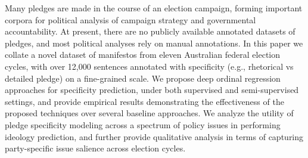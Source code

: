 Many pledges are made in the course of an election campaign, forming important corpora for political analysis of campaign strategy and governmental accountability.  At present, there are no publicly available annotated datasets of pledges, and most political analyses rely on manual annotations. In this paper we collate a novel dataset of manifestos from eleven Australian federal election cycles, with over 12,000 sentences annotated with specificity (e.g., rhetorical vs detailed pledge) on a fine-grained scale. We propose deep ordinal regression approaches for specificity prediction, under both supervised and semi-supervised settings, and provide empirical results demonstrating the effectiveness of the proposed techniques over several baseline approaches. We analyze the utility of pledge specificity modeling across a spectrum of policy issues in performing ideology prediction, and further provide qualitative analysis in terms of capturing party-specific issue salience across election cycles.